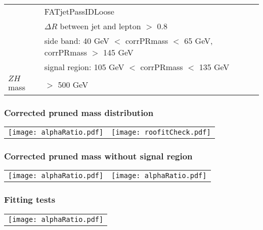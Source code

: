\documentclass[7pt,aspectratio=1610]{beamer}
\begin{document}
\begin{frame}
\begin{tiny}
\begin{center}
\begin{tabular}[t]{ | l | l | }
        & FATjetPassIDLoose                              \\
        & $\Delta R$ between jet and lepton $>$ 0.8      \\
        & side band: 40 GeV $<$ corrPRmass $<$ 65 GeV, corrPRmass $>$ 145 GeV \\
        & signal region: 105 GeV $<$ corrPRmass $<$ 135 GeV \\
        \hline
        $ZH$ mass                 
        & $>$ 500 GeV                                    \\
        \hline      
      \end{tabular}
    \end{center}   
  \end{tiny}
\end{frame}
\begin{frame}
  \frametitle{Corrected pruned mass distribution}
  \begin{center}
    \begin{tabular}{ll}
      \texttt{[image: alphaRatio.pdf]}  &
      \texttt{[image: roofitCheck.pdf]} \\
    \end{tabular}
  \end{center}
\end{frame}
\begin{frame}
  \frametitle{Corrected pruned mass without signal region}
  \begin{center}
    \begin{tabular}{ll}
      \texttt{[image: alphaRatio.pdf]} &
      \texttt{[image: alphaRatio.pdf]} \\
    \end{tabular}
  \end{center}
\end{frame}
\begin{frame}
  \frametitle{Fitting tests}
  \begin{center}
    \begin{tabular}{l}
    \texttt{[image: alphaRatio.pdf]} \\
    \end{tabular}
  \end{center}
\end{frame}
\end{document}
